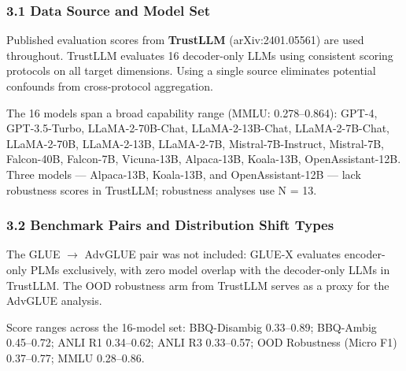 
\subsubsection{3.1 Data Source and Model Set}

Published evaluation scores from \textbf{TrustLLM} \citep{Sun2024TrustLLM} (arXiv:2401.05561) are used throughout. TrustLLM evaluates 16 decoder-only LLMs using consistent scoring protocols on all target dimensions. Using a single source eliminates potential confounds from cross-protocol aggregation.

The 16 models span a broad capability range (MMLU: 0.278--0.864): GPT-4, GPT-3.5-Turbo, LLaMA-2-70B-Chat, LLaMA-2-13B-Chat, LLaMA-2-7B-Chat, LLaMA-2-70B, LLaMA-2-13B, LLaMA-2-7B, Mistral-7B-Instruct, Mistral-7B, Falcon-40B, Falcon-7B, Vicuna-13B, Alpaca-13B, Koala-13B, OpenAssistant-12B. Three models --- Alpaca-13B, Koala-13B, and OpenAssistant-12B --- lack robustness scores in TrustLLM; robustness analyses use N = 13.

\subsubsection{3.2 Benchmark Pairs and Distribution Shift Types}

\begin{table}[htbp]
\centering
{}
\end{table}

The GLUE $\rightarrow$ AdvGLUE pair was not included: GLUE-X \citep{Yang2023GLUEX} evaluates encoder-only PLMs exclusively, with zero model overlap with the decoder-only LLMs in TrustLLM. The OOD robustness arm from TrustLLM serves as a proxy for the AdvGLUE analysis.

Score ranges across the 16-model set: BBQ-Disambig 0.33--0.89; BBQ-Ambig 0.45--0.72; ANLI R1 0.34--0.62; ANLI R3 0.33--0.57; OOD Robustness (Micro F1) 0.37--0.77; MMLU 0.28--0.86.

